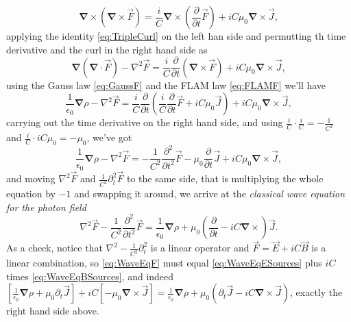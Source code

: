     \begin{equation*}
        \bm{\nabla}\times \left(\bm{\nabla} \times \vec{F} \right) = \frac{i}{C}\bm{\nabla}\times \left(\frac{\partial}{\partial t}\vec{F} \right) + iC\mu_0 \bm{\nabla}\times \vec{J},
    \end{equation*}
    applying the identity \ref{eq:TripleCurl} on the left han side and permutting th time derivative and the curl in the right hand side as
    \begin{equation*}
        \bm{\nabla}\left(\bm{\nabla}\cdot\vec{F}\right) - \nabla^2\vec{F} = \frac{i}{C}\frac{\partial}{\partial t}\left(\bm{\nabla}\times \vec{F}\right) + iC\mu_0 \bm{\nabla}\times\vec{J},
    \end{equation*}
    using the Gauss law \ref{eq:GaussF} and the FLAM law \ref{eq:FLAMF} we'll have
    \begin{equation*}
        \frac{1}{\epsilon_0}\bm{\nabla}\rho - \nabla^2 \vec{F} = \frac{i}{C}\frac{\partial}{\partial t}\left(\frac{i}{C}\frac{\partial}{\partial t}\vec{F} + iC\mu_0 \vec{J} \right)+iC\mu_0 \bm{\nabla}\times \vec{J},
    \end{equation*}
    carrying out the time derivative on the right hand side, and using $\frac{i}{C}\cdot\frac{i}{C} = -\frac{1}{C^2}$ and $\frac{i}{C}\cdot iC\mu_0 = -\mu_0$, we've got
    \begin{equation*}
        \frac{1}{\epsilon_0}\bm{\nabla}\rho - \nabla^2 \vec{F} = -\frac{1}{C^2}\frac{\partial^2}{\partial t^2}\vec{F} - \mu_0\frac{\partial}{\partial t}\vec{J} + iC\mu_0 \bm{\nabla}\times \vec{J},
    \end{equation*}
    and moving $\nabla^2\vec{F}$ and $\frac{1}{C^2}\partial_t^2\vec{F}$ to the same side, that is multiplying the whole equation by $-1$ and swapping it around, we arrive at the \textit{classical wave equation for the photon field}
    \begin{equation}\label{eq:WaveEqF}
        \nabla^2\vec{F} - \frac{1}{C^2}\frac{\partial^2}{\partial t^2}\vec{F} = \frac{1}{\epsilon_0}\bm{\nabla}\rho + \mu_0 \left(\frac{\partial}{\partial t} - iC\bm{\nabla}\times \right)\vec{J}.
    \end{equation}
    As a check, notice that $\nabla^2 - \frac{1}{C^2}\partial_t^2$ is a linear operator and $\vec{F}=\vec{E}+iC\vec{B}$ is a linear combination, so \ref{eq:WaveEqF} must equal \ref{eq:WaveEqESources} plus $iC$ times \ref{eq:WaveEqBSources}, and indeed $\left[\frac{1}{\epsilon_0}\bm{\nabla}\rho+\mu_0\partial_t\vec{J}\right] + iC\left[-\mu_0\bm{\nabla}\times\vec{J}\right] = \frac{1}{\epsilon_0}\bm{\nabla}\rho + \mu_0\left(\partial_t\vec{J} - iC\bm{\nabla}\times\vec{J}\right)$, exactly the right hand side above.

